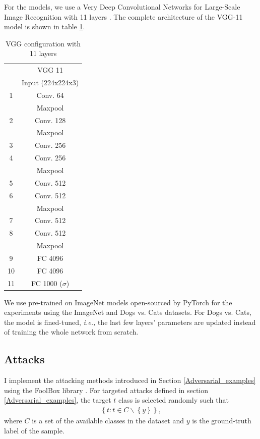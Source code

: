 For the models, we use a Very Deep Convolutional Networks for Large-Scale Image
Recognition with 11 layers \cite{simonyan_very_2015-2}. The
complete architecture of the VGG-11 model is shown in table \ref{table:vgg11}.

\begin{table}[htb]
    \centering
    \begin{tabular}{c c}
        \toprule
           & VGG 11             \\
           & Input (224x224x3)  \\
        \midrule
        1  & Conv. 64           \\
           & Maxpool            \\
        \hline
        2  & Conv. 128          \\
           & Maxpool            \\
        \hline
        3  & Conv. 256          \\
        4  & Conv. 256          \\
           & Maxpool            \\
        \hline
        5  & Conv. 512          \\
        6  & Conv. 512          \\
           & Maxpool            \\
        \hline
        7  & Conv. 512          \\
        8  & Conv. 512          \\
           & Maxpool            \\
        \hline
        9  & FC 4096            \\
        10 & FC 4096            \\
        11 & FC 1000 ($\sigma$) \\
        \bottomrule
    \end{tabular}
    \caption{VGG configuration with 11 layers}
    \label{table:vgg11}
\end{table}

We use pre-trained on ImageNet models open-sourced by PyTorch for the
experiments using the ImageNet and Dogs vs. Cats datasets. For Dogs vs. Cats,
the model is fined-tuned, \emph{i.e.,} the last few layers' parameters are
updated instead of training the whole network from scratch.

\subsection{Attacks}
\label{sec:attack}
I implement the attacking methods introduced in Section
\ref{Adversarial_examples} using the FoolBox library \cite{rauber_foolbox_2020}.
For targeted attacks defined in section \ref{Adversarial_examples}, the target
$t$ class is selected randomly such that
\begin{align} \label{eq:targeted}
    \left\{ t:t\in C \backslash \left\{
    y\right\}\right\},
\end{align}
where $C$ is a set of the available classes in the dataset and $y$ is the
ground-truth label of the sample.

